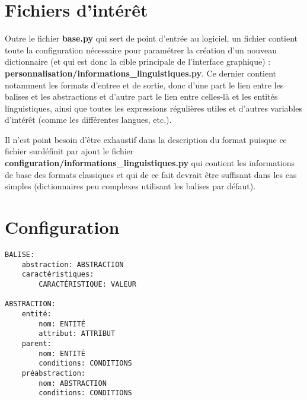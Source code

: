 \documentclass[10pt]{report}
\newcommand{\balise}[1]{\textcolor{red!80}{#1}}
\newcommand{\entité}[1]{\textcolor{blue!80!black}{#1}}
\newcommand{\abstraction}[1]{\textcolor{blue!50!red}{#1}}
\begin{document}
\section{Fichiers d’intérêt}

Outre le fichier \textbf{base.py} qui sert de point d’entrée au logiciel, un fichier contient toute la configuration nécessaire pour paramétrer la création d’un nouveau dictionnaire (et qui est donc la cible principale de l’interface graphique) : \textbf{personnalisation/informations\_linguistiques.py}. Ce dernier contient notamment les formats d’entree et de sortie, donc d’une part le lien entre les \balise{balises} et les \abstraction{abstractions} et d’autre part le lien entre \abstraction{celles-là} et les \entité{entités linguistiques}, ainsi que toutes les expressions régulières utiles et d’autres variables d’intérêt (comme les différentes langues, etc.).

\bigskip

Il n’est point besoin d’être exhaustif dans la description du format puisque ce fichier surdéfinit par ajout le fichier \textbf{configuration/informations\_linguistiques.py} qui contient les informations de base des formats classiques et qui de ce fait devrait être suffisant dans les cas simples (dictionnaires peu complexes utilisant les balises par défaut).

\section{Configuration}

\begin{verbatim}
BALISE:
    abstraction: ABSTRACTION
    caractéristiques:
        CARACTÉRISTIQUE: VALEUR
        
ABSTRACTION:
    entité:
        nom: ENTITÉ
        attribut: ATTRIBUT
    parent:
        nom: ENTITÉ
        conditions: CONDITIONS
    préabstraction: 
        nom: ABSTRACTION
        conditions: CONDITIONS
\end{verbatim}
\end{document}
